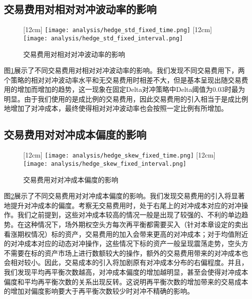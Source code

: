 \subsection{交易费用对相对对冲波动率的影响}

\begin{figure}[htb]
  \centering
  [12cm]
    {\texttt{[image: analysis/hedge\_std\_fixed\_time.png]}}
  \hspace{0.5cm}
  [12cm]
    {\texttt{[image: analysis/hedge\_std\_fixed\_interval.png]}}
    \caption[这里将出现在插图索引中]
    {交易费用对相对对冲波动率的影响}
  \label{fig:hedge_std}
\end{figure}

图\ref{fig:hedge_std}展示了不同交易费用对相对对冲波动率的影响。我们发现不同交易费用下，两个策略的相对对冲波动率水平和无交易费用时相差不大，但是基本呈现出随交易费用的增加而增加的趋势，这一现象在固定Delta对冲策略中Delta阈值为0.03时最为明显。由于我们使用的是成比例的交易费用，因此交易费用的引入相当于是成比例地增加了对冲成本，最终使得相对对冲波动率也会按照一定比例有所增加。

\subsection{交易费用对对冲成本偏度的影响}

\begin{figure}[htb]
  \centering
  [12cm]
    {\texttt{[image: analysis/hedge\_skew\_fixed\_time.png]}}
  \hspace{0.5cm}
  [12cm]
    {\texttt{[image: analysis/hedge\_skew\_fixed\_interval.png]}}
    \caption[这里将出现在插图索引中]
    {交易费用对对冲成本偏度的影响}
  \label{fig:hedge_skew}
\end{figure}

图\ref{fig:hedge_skew}展示了不同交易费用对对冲成本偏度的影响。我们发现交易费用的引入将显著地提升对冲成本的偏度。考察无交易费用时，处于右尾上的对冲成本对应的对冲操作。我们之前提到，这些对冲成本较高的情况一般是出现了较强的、不利的单边趋势。在这种情况下，场外期权空头方每次再平衡都需要买入（针对本章设定的卖出看涨期权情况）标的资产，交易费用的加入会带来更高的对冲成本；对于均值附近的对冲成本对应的动态对冲操作，这些情况下标的资产一般呈现震荡走势，空头方不需要在标的资产市场上进行数额较大的操作，额外的交易费用带来的对冲成本也会相对较小。因此，交易成本的引入将加剧原有对冲成本分布的右偏程度。并且，我们发现平均再平衡次数越高，对冲成本偏度的增加越明显，甚至会使得对冲成本偏度和平均再平衡次数的关系出现反转。这说明再平衡次数的增加带来的交易成本的增加对偏度影响要大于再平衡次数较少时对冲不精确的影响。

